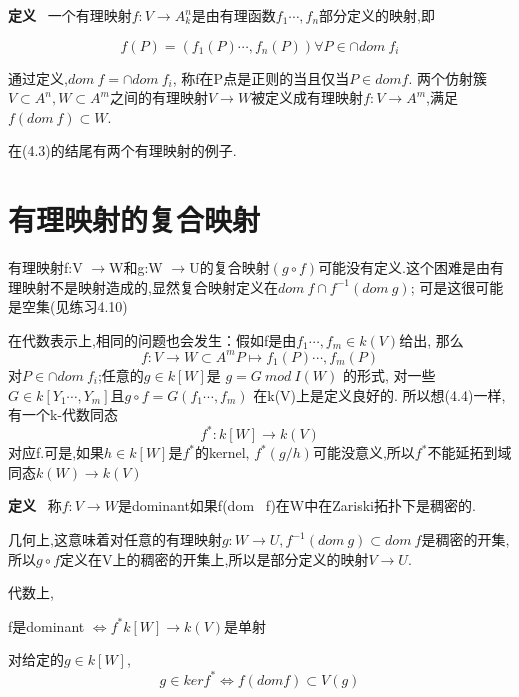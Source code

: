 \documentclass[UTF8]{book}
\begin{document}
		\textbf{定义} \ 一个有理映射$f:V\rightarrow A^{n}_{k}$是由有理函数$f_{1}\cdots ,f_{n}$部分定义的映射,即

		\begin{equation*}
		f(P)=(f_{1}(P)\cdots, f_{n}(P)) \forall P\in \cap dom \ f_{i}
		\end{equation*}

		通过定义,$dom \ f=\cap dom \ f_{i}$, 称f在P点是正则的当且仅当$P\in dom f$. 两个仿射簇$V\subset A^{n},W\subset A^{m}$之间的有理映射$V\rightarrow W$被定义成有理映射$f:V\rightarrow A^{m}$,满足$f(dom \ f)\subset W.$

		在(4.3)的结尾有两个有理映射的例子.

	\section{有理映射的复合映射}
		有理映射f:V $\rightarrow $W和g:W $\rightarrow $U的复合映射$(g\circ f)$可能没有定义.这个困难是由有理映射不是映射造成的,显然复合映射定义在$dom \ f\cap f^{-1}(dom \ g)$; 可是这很可能是空集(见练习4.10)

		在代数表示上,相同的问题也会发生：假如f是由$f_{1}\cdots ,f_{m}\in k(V)$给出, 那么
		\begin{equation*}
		f:V \rightarrow W\subset A^{m}
		P \mapsto f_{1}(P)\cdots, f_{m}(P)
		\end{equation*}
		对$P\in \cap dom \ f_{i}$;任意的$g\in k[W]$是 $g=G \ mod \ I(W)$ 的形式, 对一些$G\in k[Y_{1}\cdots,Y_{m}]$且$g\circ f=G(f_{1}\cdots ,f_{m})$ 在k(V)上是定义良好的. 所以想(4.4)一样,有一个k-代数同态
		\begin{equation*}
		f^{*}:k[W]\rightarrow k(V)
		\end{equation*}
		对应f.可是,如果$h\in k[W]$是$f^{*}$的kernel, $f^{*}(g/h)$可能没意义,所以$f^{*}$不能延拓到域同态$k(W)\rightarrow k(V)$

		\textbf{定义} \ 称$f:V \rightarrow W$是dominant如果f(dom \ f)在W中在Zariski拓扑下是稠密的.

		几何上,这意味着对任意的有理映射$g:W\rightarrow U,  f^{-1}(dom \ g)\subset dom \ f$是稠密的开集,所以$g\circ f$定义在V上的稠密的开集上,所以是部分定义的映射$V\rightarrow U$.

		代数上,

		\center  f是dominant $\iff f^{*}k[W]\rightarrow k(V)$是单射

		\justifying
		对给定的$g\in k[W]$,
		\begin{equation*}
		g\in ker f^{*} \iff f(dom f)\subset V(g)
		\end{equation*}
\end{document}
